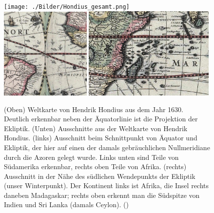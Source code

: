 \begin{figure}[p]
\texttt{[image: ./Bilder/Hondius\_gesamt.png]}\\[0.2cm]
\includegraphics[width=0.4\textwidth]{./Bilder/Hondius_00.jpg} \hfill
\includegraphics[width=0.58\textwidth]{./Bilder/Hondius_90.jpg}
\caption{\label{fig_Hondius}%
(Oben) Weltkarte von Hendrik Hondius aus dem Jahr 1630. Deutlich erkennbar neben der
\"Aquatorlinie ist die Projektion der Ekliptik. (Unten)
Ausschnitte aus der Weltkarte von Hendrik Hondius. (links) Ausschnitt beim Schnittpunkt von 
\"Aquator und Ekliptik, der hier auf einen der damals gebr\"auchlichen Nullmeridiane durch die
Azoren gelegt wurde. Links unten sind Teile von S\"udamerika erkennbar, rechts oben Teile von
Afrika. (rechts) Ausschnitt in der N\"ahe des s\"udlichen Wendepunkts der Ekliptik (unser
Winterpunkt). Der Kontinent links ist Afrika, die Insel rechts daneben Madagaskar; rechts oben
erkennt man die S\"udspitze von Indien und Sri Lanka (damals Ceylon). (\cite{Puzzle})}
\end{figure}

